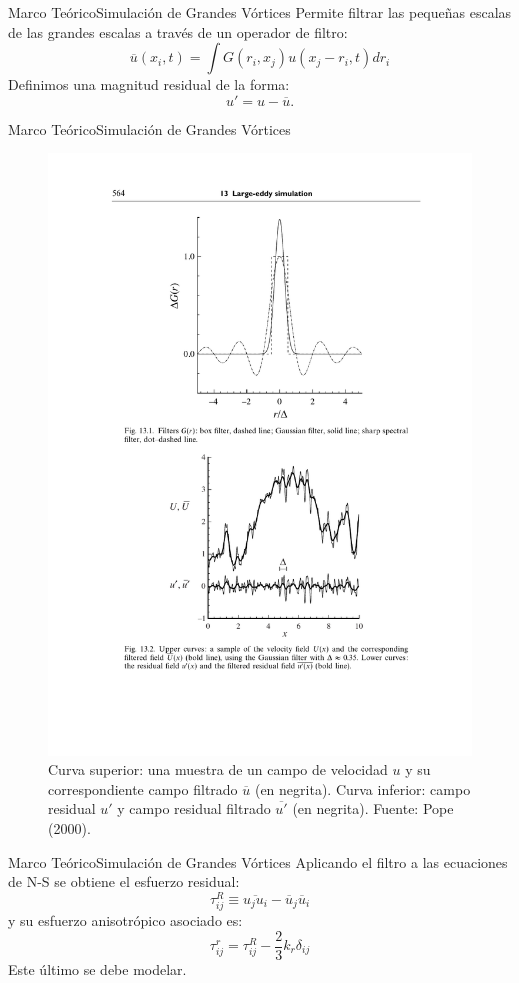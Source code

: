\documentclass[mathserif,10pt]{beamer}
\newcommand{\be}{\begin{equation}}
\newcommand{\ee}{\end{equation}}
\begin{document}
\begin{frame}{Marco Teórico}{Simulación de Grandes Vórtices}
	Permite filtrar las pequeñas escalas de las grandes escalas a través de un operador de filtro:
	\begin{equation}
	\overline{u}(x_i,t) = \int G(r_i,x_j) u(x_j-r_i,t)dr_i
	\end{equation}
	Definimos una magnitud residual de la forma:
	\begin{equation}
	u' = u - \overline{u}.
	\end{equation}
\end{frame}

\begin{frame}{Marco Teórico}{Simulación de Grandes Vórtices}
	\begin{figure}[h!]
		\centering
		\includegraphics[width=0.7\linewidth,trim={4.8cm 4.8cm 2.8cm 12.1cm},clip]{fig/03/les}
		\caption{Curva superior: una muestra de un campo de velocidad $u$ y su correspondiente campo filtrado $\overline{u}$ (en negrita). Curva inferior: campo residual $u'$ y campo residual filtrado $\overline{u'}$ (en negrita). Fuente: Pope (2000).}
		\label{fig:03_les}
	\end{figure}
\end{frame}

\begin{frame}{Marco Teórico}{Simulación de Grandes Vórtices}
	Aplicando el filtro a las ecuaciones de N-S se obtiene el esfuerzo residual:
	\be \tau_{ij}^R \equiv \overline{u_j u_i} - \overline{u}_j \overline{u}_i \ee
	y su esfuerzo anisotrópico asociado es:
	\be \tau_{ij}^r = \tau_{ij}^R - \frac{2}{3}k_r \delta_{ij} \ee
	Este último se debe modelar.
\end{frame}
\end{document}
